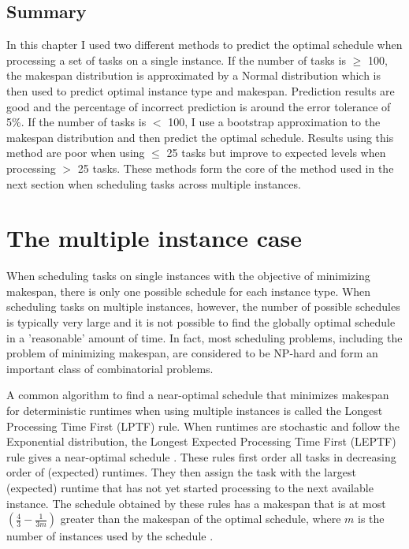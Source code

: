 \documentclass[12pt]{report}
\begin{document}
\section{Summary}
In this chapter I used two different methods to predict the optimal schedule when processing a set of tasks on a single instance. 
If the number of tasks is $\geq$ 100, the makespan distribution is approximated by a Normal distribution which is then used to predict optimal instance type and makespan. 
Prediction results are good and the percentage of incorrect prediction is around the error tolerance of 5\%. 
If the number of tasks is $<$ 100, I use a bootstrap approximation to the makespan distribution and then predict the optimal schedule. 
Results using this method are poor when using $\leq$ 25 tasks but improve to expected levels when processing $>$ 25 tasks.
These methods form the core of the method used in the next section when scheduling tasks across multiple instances.

\chapter{The multiple instance case}

When scheduling tasks on single instances with the objective of minimizing makespan, there is only one possible schedule for each instance type.
When scheduling tasks on multiple instances, however, the number of possible schedules is typically very large and it is not possible to find the globally optimal schedule in a 'reasonable' amount of time.
In fact, most scheduling problems, including the problem of minimizing makespan, are considered to be NP-hard \cite{Garey1979} and form an important class of combinatorial problems.

A common algorithm to find a near-optimal schedule that minimizes makespan for deterministic runtimes when using multiple instances is called the Longest Processing Time First (LPTF) rule.
When runtimes are stochastic and follow the Exponential distribution, the Longest Expected Processing Time First (LEPTF) rule gives a near-optimal schedule \cite{Pinedo2012}. 
These rules first order all tasks in decreasing order of (expected) runtimes.
They then assign the task with the largest (expected) runtime that has not yet started processing to the next available instance. 
The schedule obtained by these rules has a makespan that is at most $\left(\frac{4}{3} - \frac{1}{3m} \right)$ greater than the makespan of the optimal schedule, where $m$ is the number of instances used by the schedule \cite{Graham1969}.
\end{document}
